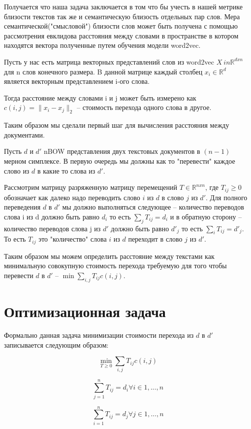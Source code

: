 \documentclass[10pt,reqno]{amsart}
\theoremstyle{definition}
\theoremstyle{remark}
\begin{document}
Получается что наша задача заключается в том что бы учесть в нашей метрике близости текстов так же и семантическую близость отдельных пар слов. Мера семантической("смысловой") близости слов может быть получена с помощью рассмотрения евклидова расстояния между словами в пространстве в котором находятся вектора полученные путем обучения модели word2vec.


Пусть у нас есть матрица векторных представлений слов из word2vec $X \ in \mathbb{R}^{dxn}$ для n слов конечного размера. B данной матрице каждый столбец $x_i \in \mathbb{R}^{d}$ является векторным представлением i-ого слова.

Тогда расстояние между словами i и j может быть измерено как $c(i, j) = \|x_i - x_j \|_2$  -- стоимость перехода одного слова в другое.


Таким образом мы сделали первый шаг для вычисления расстояния между документами.


Пусть $d$ и $d'$ nBOW представления двух текстовых документов в $(n - 1)$ мерном симплексе. В первую очередь мы должны как то "перевести"  каждое слово из $d$ в какие то слова из $d'$.

Рассмотрим матрицу разряженную матрицу перемещений  $T \in \mathbb{R}^{nxn}$, где $T_{ij} \geq 0$ обозначает как далеко надо переводить слово $i$ из $d$ в слово $j$ из $d'$. Для полного переведения $d$ в $d'$ мы должно выполняться следующее -- количество переводов слова i из d должно быть равно $d_i$ то есть $\sum_{j} T_{ij} = d_i$ и в обратную сторону -- количество переводов слова j из $d'$ должно быть равно $d'_j$ то есть $\sum_{i} T_{ij} = d'_j$. То есть $T_{ij}$ это "количество" слова $i$ из $d$ переходит в слово $j$ из $d'$.

Таким образом мы можем определить расстояние между текстами как минимальную совокупную стоимость перехода требуемую для того чтобы перевести $d$ в $d'$ -- $\min \sum_{i,j} T_{ij} c(i,j)$.


\section{Оптимизационная задача}

Формально данная задача минимизации стоимости перехода из $d$ в $d'$ записывается следующим образом:

$$
\min_{T \geq 0} \sum_{i,j} T_{ij} c(i,j)
$$

$$
\sum_{j = 1}^n T_{ij} = d_i \forall i \in {1, ..., n}
$$

$$
\sum_{i = 1}^n T_{ij} = d_j \forall j \in {1, ..., n}
$$
\end{document}
